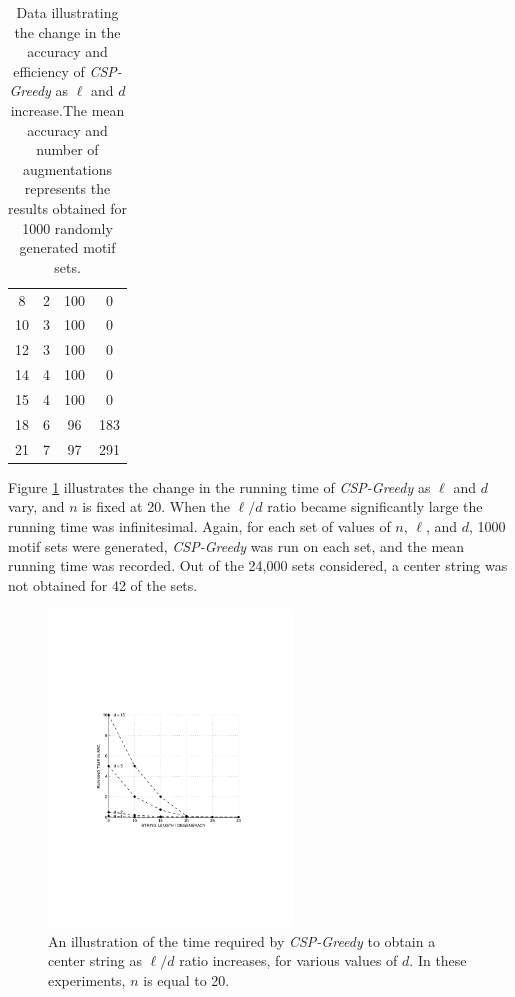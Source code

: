 \begin{table}[h!]
\begin{center}
{\begin{tabular}{|cc||c|c|}
	8  		& 2				& 100  		& 0 \\
	10		& 3 			& 100  		& 0	\\
	12		& 3				& 100  		& 0 \\	
	14		& 4		& 100  		& 0 \\
	15		& 4			& 100  		& 0 \\
	18		&	6							& 96 		& 183 \\
	21		& 7				& 97  		& 291 \\
\hline
\end{tabular} }
\end{center}
\caption[Data illustrating the change in the accuracy and efficiency of {\em CSP-Greedy} as $\ell$ and $d$ increase.]{Data illustrating the change in the accuracy and efficiency of {\em CSP-Greedy} as $\ell$ and $d$ increase.The mean accuracy and number of augmentations represents the results obtained for 1000 randomly generated motif sets.}
\label{closest_string_chapter:table1}
\end{table} 
\newpage

Figure \ref{fig:csp_greedy_plot} illustrates the change in the running time of {\em CSP-Greedy} as $\ell$ and $d$ vary, and $n$ is fixed at 20.  When the $\ell / d$ ratio became significantly large the running time was infinitesimal.  Again, for each set of values of $n$, $\ell$, and $d$, 1000 motif sets were generated, {\em CSP-Greedy} was run on each set, and the mean running time was recorded.  Out of the 24,000 sets considered, a center string was not obtained for 42 of the sets.   

\begin{figure}[h!]
\centering
\includegraphics[width=65mm,trim=7cm 8cm 7cm 7cm]{images/csp_greedy_running_time_v1}%
 \caption[An illustration of the time required by {\em CSP-Greedy} to obtain a center string as $\ell/d$ ratio increases, for various values of $d$.]{An illustration of the time required by {\em CSP-Greedy} to obtain a center string as $\ell/d$ ratio increases, for various values of $d$. In these experiments, $n$ is equal to 20. }
\label{fig:csp_greedy_plot}
\end{figure}


